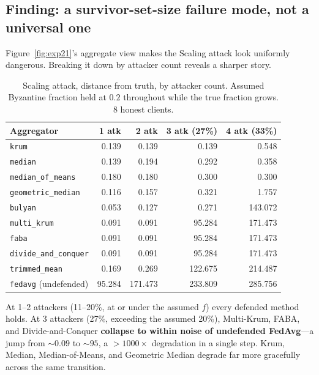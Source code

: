 \documentclass[11pt,a4paper]{article}
\newcommand{\code}[1]{\texttt{\small #1}}
\newcommand{\bad}[1]{\textcolor{red!70!black}{#1}}
\begin{document}
\subsection{Finding: a survivor-set-size failure mode, not a universal one}
\label{sec:paramismatch}

Figure~\ref{fig:exp21}'s aggregate view makes the Scaling attack look
uniformly dangerous. Breaking it down by attacker count reveals a sharper
story.

\begin{table}[htbp]
\centering
\small
\caption{Scaling attack, distance from truth, by attacker count. Assumed
Byzantine fraction held at $0.2$ throughout while the true fraction grows.
8 honest clients.}
\label{tab:paramismatch}
\begin{tabular}{lrrrr}
\toprule
\textbf{Aggregator} & \textbf{1 atk} & \textbf{2 atk} & \textbf{3 atk (27\%)} & \textbf{4 atk (33\%)} \\
\midrule
\code{krum}                 & 0.139 & 0.139 & 0.139 & 0.548 \\
\code{median}               & 0.139 & 0.194 & 0.292 & 0.358 \\
\code{median\_of\_means}    & 0.180 & 0.180 & 0.300 & 0.300 \\
\code{geometric\_median}    & 0.116 & 0.157 & 0.321 & 1.757 \\
\midrule
\code{bulyan}               & 0.053 & 0.127 & 0.271 & \bad{143.072} \\
\code{multi\_krum}          & 0.091 & 0.091 & \bad{95.284} & \bad{171.473} \\
\code{faba}                 & 0.091 & 0.091 & \bad{95.284} & \bad{171.473} \\
\code{divide\_and\_conquer} & 0.091 & 0.091 & \bad{95.284} & \bad{171.473} \\
\code{trimmed\_mean}        & 0.169 & 0.269 & \bad{122.675} & \bad{214.487} \\
\midrule
\code{fedavg} (undefended)  & 95.284 & 171.473 & 233.809 & 285.756 \\
\bottomrule
\end{tabular}
\end{table}

At 1--2 attackers (11--20\%, at or under the assumed $f$) every defended
method holds. At 3 attackers (27\%, exceeding the assumed 20\%),
Multi-Krum, FABA, and Divide-and-Conquer \textbf{collapse to within noise
of undefended FedAvg}---a jump from ${\sim}0.09$ to ${\sim}95$, a
${>}1000\times$ degradation in a single step. Krum, Median,
Median-of-Means, and Geometric Median degrade far more gracefully across
the same transition.
\end{document}
